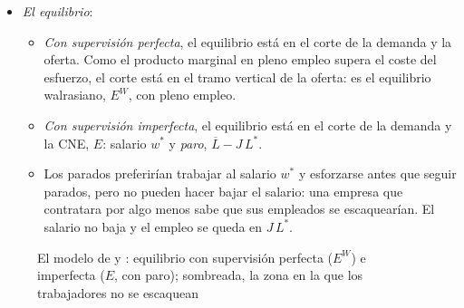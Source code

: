 \documentclass[11pt]{article}
\begin{document}
\begin{itemize}
  \begin{itemize}
  \item la \emph{demanda de trabajo} es convencional: cada empresa contrata hasta que el producto marginal iguala el salario, $A\,\overline{e}\,F'(\overline{e}\,L)=w$;
  \item la \emph{oferta de trabajo} es horizontal en $\overline{e}$ (nadie trabaja por menos de lo que le cuesta esforzarse) hasta $\overline{L}$, donde se hace vertical;
  \item la \emph{CNE} es creciente, parte de $\overline{e}+(\rho+s)\,\overline{e}/q$ sin empleo y se hace vertical al acercarse a $\overline{L}$;
  \item la \emph{zona sombreada}, por encima de la CNE, reúne los salarios con los que, a cada nivel de empleo, los trabajadores no se escaquean; por debajo, se escaquean.
  \end{itemize}
\item \emph{El equilibrio}:
  \begin{itemize}
  \item \emph{Con supervisión perfecta}, el equilibrio está en el corte de la demanda y la oferta. Como el producto marginal en pleno empleo supera el coste del esfuerzo, el corte está en el tramo vertical de la oferta: es el equilibrio walrasiano, $E^W$, con pleno empleo.
  \item \emph{Con supervisión imperfecta}, el equilibrio está en el corte de la demanda y la CNE, $E$: salario $w^*$ y \emph{paro}, $\overline{L}-J\,L^*$.
  \item Los parados preferirían trabajar al salario $w^*$ y esforzarse antes que seguir parados, pero no pueden hacer bajar el salario: una empresa que contratara por algo menos sabe que sus empleados se escaquearían. El salario no baja y el empleo se queda en $J\,L^*$.
  \end{itemize}
\end{itemize}

\begin{figure}[H]
\centering
\caption{El modelo de  y : equilibrio con supervisión perfecta ($E^W$) e imperfecta ($E$, con paro); sombreada, la zona en la que los trabajadores no se escaquean}\label{fig:shapiro-stiglitz}
\end{figure}
\end{document}
